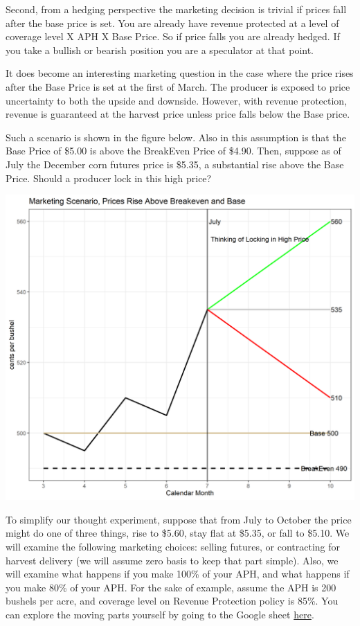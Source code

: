 \documentclass[
  letterpaper,
  DIV=11,
  numbers=noendperiod]{scrreprt}
\begin{document}
Second, from a hedging perspective the marketing decision is trivial if
prices fall after the base price is set. You are already have revenue
protected at a level of coverage level X APH X Base Price. So if price
falls you are already hedged. If you take a bullish or bearish position
you are a speculator at that point.

It does become an interesting marketing question in the case where the
price rises after the Base Price is set at the first of March. The
producer is exposed to price uncertainty to both the upside and
downside. However, with revenue protection, revenue is guaranteed at the
harvest price unless price falls below the Base price.

Such a scenario is shown in the figure below. Also in this assumption is
that the Base Price of \$5.00 is above the BreakEven Price of \$4.90.
Then, suppose as of July the December corn futures price is \$5.35, a
substantial rise above the Base Price. Should a producer lock in this
high price?

\includegraphics{assets/cropins_ex.png}

To simplify our thought experiment, suppose that from July to October
the price might do one of three things, rise to \$5.60, stay flat at
\$5.35, or fall to \$5.10. We will examine the following marketing
choices: selling futures, or contracting for harvest delivery (we will
assume zero basis to keep that part simple). Also, we will examine what
happens if you make 100\% of your APH, and what happens if you make 80\%
of your APH. For the sake of example, assume the APH is 200 bushels per
acre, and coverage level on Revenue Protection policy is 85\%. You can
explore the moving parts yourself by going to the Google sheet
\href{https://docs.google.com/spreadsheets/d/1rbne8odUljxIuIYP3IRiWyzaQDs83-mjOkuaaDWxb3w/edit?usp=sharing}{here}.
\end{document}
